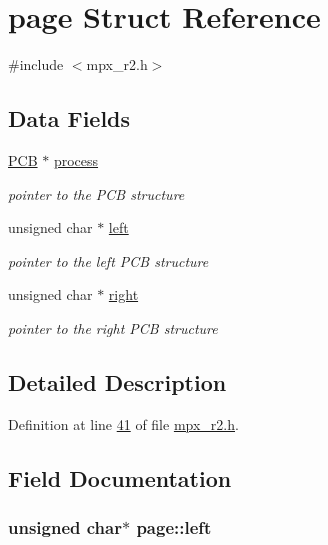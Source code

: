 \hypertarget{structpage}{
\section{page Struct Reference}
\label{structpage}
}


{\ttfamily \#include $<$mpx\_\-r2.h$>$}

\subsection*{Data Fields}
\begin{DoxyCompactItemize}
\item 
\hyperlink{structprocess}{PCB} $\ast$ \hyperlink{structpage_af3cc0e1320b79159b230f154f1a95f0d}{process}
\begin{DoxyCompactList}\small\item\em pointer to the PCB structure \item\end{DoxyCompactList}\item 
unsigned char $\ast$ \hyperlink{structpage_a450d16b8cb803158a4dab05bb36fd7f5}{left}
\begin{DoxyCompactList}\small\item\em pointer to the left PCB structure \item\end{DoxyCompactList}\item 
unsigned char $\ast$ \hyperlink{structpage_a59bb1b5eca2d579befcc93a2833f4dfd}{right}
\begin{DoxyCompactList}\small\item\em pointer to the right PCB structure \item\end{DoxyCompactList}\end{DoxyCompactItemize}


\subsection{Detailed Description}


Definition at line \hyperlink{mpx__r2_8h_source_l00041}{41} of file \hyperlink{mpx__r2_8h_source}{mpx\_\-r2.h}.



\subsection{Field Documentation}
\hypertarget{structpage_a450d16b8cb803158a4dab05bb36fd7f5}{
\subsubsection[{left}]{\setlength{\rightskip}{0pt plus 5cm}unsigned char$\ast$ {\bf page::left}}}
\label{structpage_a450d16b8cb803158a4dab05bb36fd7f5}


